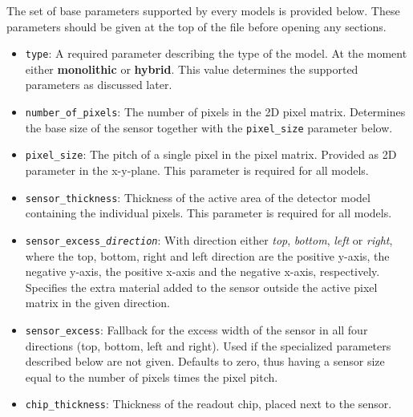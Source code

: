 The set of base parameters supported by every models is provided below.
These parameters should be given at the top of the file before opening any sections.
\begin{itemize}
\item \texttt{type}: A required parameter describing the type of the model.
At the moment either \textbf{monolithic} or \textbf{hybrid}.
This value determines the supported parameters as discussed later.
\item \texttt{number\_of\_pixels}: The number of pixels in the 2D pixel matrix.
Determines the base size of the sensor together with the \texttt{pixel\_size} parameter below.
\item \texttt{pixel\_size}: The pitch of a single pixel in the pixel matrix.
Provided as 2D parameter in the x-y-plane.
This parameter is required for all models.
\item \texttt{sensor\_thickness}: Thickness of the active area of the detector model containing the individual pixels.
This parameter is required for all models.
\item \texttt{sensor\_excess\_\textit{direction}}: With direction either \textit{top}, \textit{bottom}, \textit{left} or \textit{right}, where the top, bottom, right and left direction are the positive y-axis, the negative y-axis, the positive x-axis and the negative x-axis, respectively.
Specifies the extra material added to the sensor outside the active pixel matrix in the given direction.
\item \texttt{sensor\_excess}: Fallback for the excess width of the sensor in all four directions (top, bottom, left and right).
Used if the specialized parameters described below are not given.
Defaults to zero, thus having a sensor size equal to the number of pixels times the pixel pitch.
\item \texttt{chip\_thickness}: Thickness of the readout chip, placed next to the sensor.
\end{itemize}


